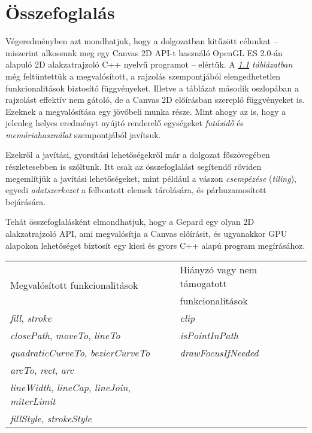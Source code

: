 \documentclass[12pt]{report}
\theoremstyle{definition}
\newcommand{\inenglish}[1]{\textsl{#1}}
\newcommand{\func}[1]{{\textsl{#1}}}
\begin{document}

    \chapter{Összefoglalás}

Végeredményben azt mondhatjuk, hogy a dolgozatban kitűzött célunkat -- miszerint
alkossunk meg egy Canvas 2D API-t használó OpenGL ES 2.0-án alapuló 2D
alakzatrajzoló C++ nyelvű programot -- elértük. A \emph{\ref{tab:functions}
táblázatban} még feltüntettük a megvalósított, a rajzolás szempontjából
elengedhetetlen funkcionalitások biztosító függvényeket. Illetve a táblázat
második oszlopában a rajzolást effektív nem gátoló, de a Canvas 2D előírásban
szereplő függvényeket is. Ezeknek a megvalósítása egy jövőbeli munka
része. Mint ahogy az is, hogy a jelenleg helyes eredményt nyújtó renderelő
egységeket \emph{futásidő} és \emph{memóriahasználat} szempontjából javítsuk.

Ezekről a javítási, gyorsítási lehetőségekről már a dolgozat főszövegében
részletesebben is szóltunk. Itt csak az összefoglalást segítendő röviden
megemlítjük a javítási lehetőségeket, mint például a vászon \emph{csempézése}
(\inenglish{tiling}), egyedi \emph{adatszerkezet} a felbontott elemek
tárolására, és párhuzamosított bejárására.

Tehát összefoglalásként elmondhatjuk, hogy a Gepard egy olyan 2D
alakzatrajzoló API, ami megvalósítja a Canvas előírásit, és ugyanakkor
GPU alapokon lehetőséget biztosít egy kicsi és gyors C++ alapú program
megírásához.

  \begin{table}[b]
    \label{tab:functions}
    \renewcommand*{\arraystretch}{1.2}
    \centering
    \begin{tabular}{|l|l|}
      \hline
      \multirow{2}{*}{Megvalósított funkcionalitások} & Hiányzó vagy nem
      támogatott \\
      & funkcionalitások \\
      \hline \hline
      \func{fill}, \func{stroke} & \func{clip} \\ \cline{1-1}
      \func{closePath}, \func{moveTo}, \func{lineTo}  & \func{isPointInPath} \\
      \cline{2-2}
      \func{quadraticCurveTo}, \func{bezierCurveTo} & \func{drawFocusIfNeeded}
      \\
      \func{arcTo}, \func{rect}, \func{arc} &  \\ \cline{1-1}
      \func{lineWidth}, \func{lineCap}, \func{lineJoin}, \func{miterLimit} & \\
      \func{fillStyle}, \func{strokeStyle} &  \\
      \hline
    \end{tabular}
  \end{table}
\end{document}
